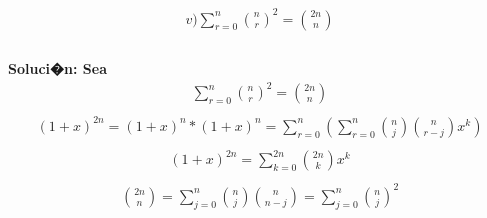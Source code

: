 \documentclass{article}
\begin{document}
\begin{enumerate}
    \begin{gather*}
         v) \sum_{r=0}^{n} {\binom{n}{r}}^2 =\binom{2n}{n}\\ 
    \end{gather*}
    \\\textbf{Soluci�n: Sea }\\
    \begin{gather*}
        \sum_{r=0}^{n} {\binom{n}{r}}^2 =\binom{2n}{n}\\ 
    \end{gather*}
     \begin{gather*}
        {(1+x)}^{2n} = {(1+x)}^n * {(1+x)}^n = \sum_{r=0}^{n} (\sum_{r=0}^{n} \binom{n}{j} \binom{n}{r-j} x^k)\\ 
    \end{gather*}
    \begin{gather*}
        {(1+x)}^{2n} = \sum_{k=0}^{2n} \binom{2n}{k} x^k\\ 
    \end{gather*}
    \begin{gather*}
        \binom{2n}{n} = \sum_{j=0}^{n} \binom{n}{j} \binom{n}{n-j} = \sum_{j=0}^{n} {\binom{n}{j}}^2\\ 
    \end{gather*}
    
    \end{enumerate}
\end{document}
